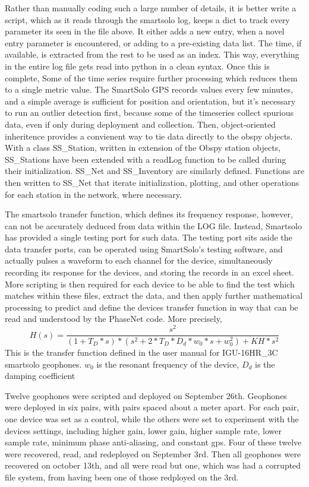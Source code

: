 Rather than manually coding such a large number of details, it is better write a script, which as it reads through the smartsolo log, keeps a dict to track every 
parameter its seen in the file above. It either adds a new entry, when a novel entry parameter is encountered, or  adding to a pre-existing data list. 
The time, if available, is extracted from the rest to be used as an index. This way, everything in the entire log file gets read into python in a clean syntax. 
 Once this is complete, Some of the time series require further processing 
which reduces them to a single metric value. The SmartSolo GPS records values every few minutes, and a simple average is sufficient for 
position and orientation, but it's necessary to run an outlier detection first, because some of the timeseries collect spurious data, even if only during deployment and collection.
Then,  object-oriented inheritence provides a convienent way to tie data directly to the obspy objects. With a class SS\_Station, written in extension of the Obspy station objects,
SS\_Stations have been extended with a readLog function to be called during their initialization. SS\_Net and  SS\_Inventory are similarly defined. 
Functions are then written to SS\_Net that iterate initialization, plotting, and other operations for each station in the network, where necessary.

The smartsolo transfer function, which defines its frequency response, however, can not be accurately deduced from data within the LOG file. Instead, 
Smartsolo has provided a single testing port for such data. The testing port sits aside the data transfer ports, can be operated using SmartSolo's testing software, 
and actually pulses a waveform to each channel for the device, simultaneously recording its response for the devices, and storing the records in an excel sheet.
More scripting is then required for each device to be able to find the test which matches within these files, extract the data, and then apply further mathematical processing to predict 
and define the devices transfer function in way that can be read and understood by the PhaseNet code. More precisely, 
\begin{equation}
    H(s) = \frac{s^2}{(1+T_D*s)*(s^2+2*T_D*D_d*w_0*s+w_0^2)+KH*s^2}
\end{equation}
This is the transfer function defined in the user manual for IGU-16HR\_3C smartsolo geophones. $w_0$ is the resonant frequency of the device, $D_d$ is the damping coefficient

Twelve geophones were scripted and deployed on September 26th. Geophones were deployed in six pairs, with pairs spaced about a meter apart. For each pair, one device was set as a control, 
while the others were set to experiment with the devices settings, including higher gain, lower gain, higher sample rate, lower sample rate, minimum phase anti-aliasing, and constant gps. 
Four of these twelve were recovered, read, and redeployed on September 3rd. 
Then all geophones were recovered on october 13th, and all were read but one, which was had a corrupted file system, from having been one of those redployed on the 3rd. 



